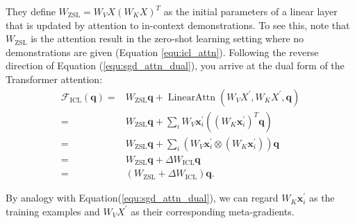 They define $W_{\text{ZSL}} = W_{V} X \left( W_{K} X \right)^T$ as the initial parameters of a linear layer that is updated by attention to in-context demonstrations.
To see this, note that $W_{\text{ZSL}}$ is the attention result in the zero-shot learning setting where no demonstrations are given (Equation \ref{equ:icl_attn}). 
Following the reverse direction of Equation (\ref{equ:sgd_attn_dual}), you arrive at the dual form of the Transformer attention: 
\begin{equation}
    \begin{aligned}
        \mathcal{F}_{\text{ICL}}(\mathbf{q})
        = & W_{\text{ZSL}} \mathbf{q} + \operatorname{LinearAttn} \left( W_{V} X^{\prime}, W_{K} X^{\prime}, \mathbf{q} \right) \\
        = & W_{\text{ZSL}} \mathbf{q} + \sum_i W_{V} \textbf{x}^{\prime}_i \left( \left( W_{K} \textbf{x}^{\prime}_i \right)^T \mathbf{q} \right) \\
        = & W_{\text{ZSL}} \mathbf{q} + \sum_i \left( W_{V} \textbf{x}^{\prime}_i \otimes \left( W_{K} \textbf{x}^{\prime}_i \right) \right) \mathbf{q} \\
        = & W_{\text{ZSL}} \mathbf{q} + \Delta W_{\text{ICL}} \mathbf{q} \\
        = & \left( W_{\text{ZSL}} + \Delta W_{\text{ICL}} \right) \mathbf{q}. 
    \end{aligned}
    \label{equ:icl_opti_dual}
\end{equation}

By analogy with Equation(\ref{equ:sgd_attn_dual}), we can regard $W_{K} \textbf{x}^{\prime}_i$ as the training examples and $W_{V} X^{\prime}$ as their corresponding meta-gradients. 